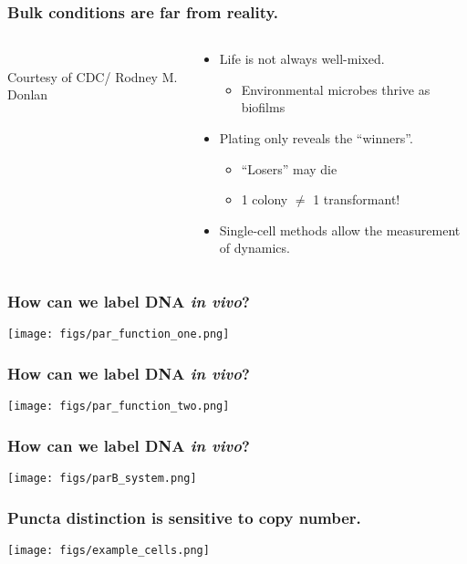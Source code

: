 \begin{frame}
	\frametitle{Bulk conditions are far from reality.}

\begin{columns}[T]
	\begin{column}{0.48\textwidth}
		\\
		\tiny{Courtesy of CDC/ Rodney M. Donlan}
	\end{column}
	
	\begin{column}{0.48\textwidth}
	\begin{itemize}
		\item Life is not always well-mixed.
		\begin{itemize}
			\item Environmental microbes thrive as biofilms
		\end{itemize}

		\item Plating only reveals the ``winners''.
			\begin{itemize}
				\item ``Losers'' may die
				\item 1 colony $\neq$ 1 transformant!
			\end{itemize} 
		\item Single-cell methods allow the measurement of dynamics.
	\end{itemize}
\end{column}
\end{columns}
\end{frame}

\begin{frame}
	\frametitle{How can we label DNA \emph{in vivo}?}
	\centerline{\texttt{[image: figs/par\_function\_one.png]}}
\end{frame}

\begin{frame}
	\frametitle{How can we label DNA \emph{in vivo}?}
	\centerline{\texttt{[image: figs/par\_function\_two.png]}}
\end{frame}

\begin{frame}
	\frametitle{How can we label DNA \emph{in vivo}?}
	\centerline{\texttt{[image: figs/parB\_system.png]}}
\end{frame}
\begin{frame}
	\frametitle{Puncta distinction is sensitive to copy number.}

	\centerline{\texttt{[image: figs/example\_cells.png]}}
\end{frame}

